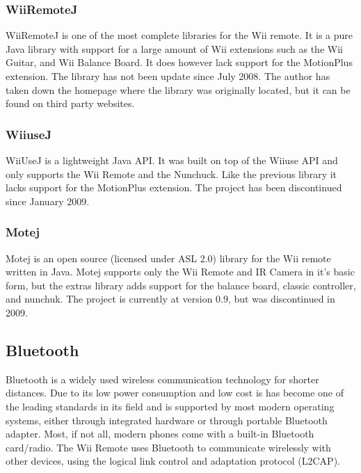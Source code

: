 \subsubsection{WiiRemoteJ}
WiiRemoteJ is one of the most complete libraries for the Wii remote. It is a pure Java library with support for a large amount of Wii extensions such as the Wii Guitar, and Wii Balance Board. It does however lack support for the MotionPlus extension. The library has not been update since July 2008. The author has taken down the homepage where the library was originally located, but it can be found on third party websites. \cite{WiiRemoteJ}

\subsubsection{WiiuseJ}
WiiUseJ is a lightweight Java API. It was built on top of the Wiiuse API and only supports the Wii Remote and the Nunchuck. Like the previous library it lacks support for the MotionPlus extension. The project has been discontinued since January 2009. \cite{Wiiusej}

\subsubsection{Motej}
Motej is an open source (licensed under ASL 2.0) library for the Wii remote written in Java. Motej supports only the Wii Remote and IR Camera in it's basic form, but the extras library adds support for the balance board, classic controller, and nunchuk. The project is currently at version 0.9, but was discontinued in 2009. \cite{Motej}

\subsection{Bluetooth}
Bluetooth is a widely used wireless communication technology for shorter distances. Due to its low power consumption and low cost is has become one of the leading standards in its field and is supported by most modern operating systems, either through integrated hardware or through portable Bluetooth adapter. Most, if not all, modern phones come with a built-in Bluetooth card/radio. %
The Wii Remote uses Bluetooth to communicate wirelessly with other devices, using the logical link control and adaptation protocol (L2CAP). 
